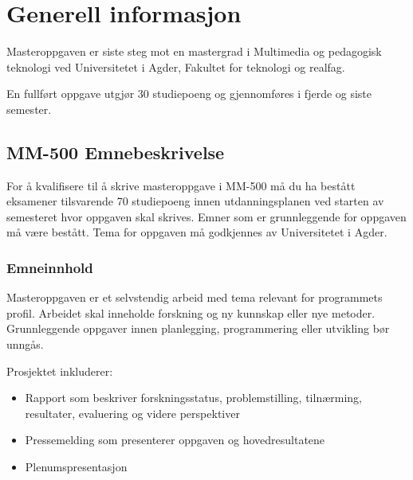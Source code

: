 \chapter{Generell informasjon}

Masteroppgaven er siste steg mot en mastergrad i Multimedia og pedagogisk teknologi ved Universitetet i Agder, Fakultet for teknologi og realfag.

En fullført oppgave utgjør 30 studiepoeng og gjennomføres i fjerde og siste semester.

\section{MM-500 Emnebeskrivelse}

For å kvalifisere til å skrive masteroppgave i MM-500 må du ha bestått eksamener tilsvarende 70 studiepoeng innen utdanningsplanen ved starten av semesteret hvor oppgaven skal skrives. Emner som er grunnleggende for oppgaven må være bestått. Tema for oppgaven må godkjennes av Universitetet i Agder.

\subsection{Emneinnhold}

Masteroppgaven er et selvstendig arbeid med tema relevant for programmets profil. Arbeidet skal inneholde forskning og ny kunnskap eller nye metoder. Grunnleggende oppgaver innen planlegging, programmering eller utvikling bør unngås.

Prosjektet inkluderer:
\begin{itemize}
\item Rapport som beskriver forskningsstatus, problemstilling, tilnærming, resultater, evaluering og videre perspektiver
\item Pressemelding som presenterer oppgaven og hovedresultatene
\item Plenums­presentasjon
\end{itemize}
